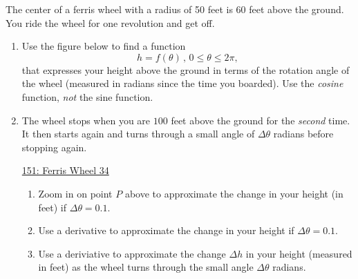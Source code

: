 \documentclass{ximera}
\begin{document}
\begin{question}  \label{Qd5t65yy6yuu}
The center of a ferris wheel with a radius of 50 feet is 60 feet above the ground. You ride the wheel for one revolution and get off.

\begin{enumerate}

\item Use the figure below to find a function 
\[
 h = f(\theta) \, , \, 0\leq \theta \leq 2\pi ,
\] 
that expresses your height above the ground in terms of the rotation angle of the wheel (measured in radians since the time you boarded). Use the \emph{cosine} function, \emph{not} the sine function.


\begin{onlineOnly}
    \begin{center}
\end{center}
\end{onlineOnly}


\item The wheel stops when you are $100$ feet above the ground for the \emph{second} time. It then starts again and turns through a small angle of $\Delta \theta$ radians before stopping again.


\begin{onlineOnly}
    \begin{center}
\end{center}
\end{onlineOnly}

\href{https://www.desmos.com/calculator/gi8obqmnav}{151: Ferris Wheel 34}


\begin{enumerate}

\item Zoom in on point $P$ above to approximate the change in your height (in feet) if $\Delta \theta = 0.1$.

\item Use a derivative to approximate the change in your height if $\Delta \theta = 0.1$.

\item Use a deriviative to approximate the change $\Delta h$ in your height (measured in feet) as the wheel turns through the small angle $\Delta \theta$ radians.

\end{enumerate}
\end{enumerate}
\end{question}
\end{document}
